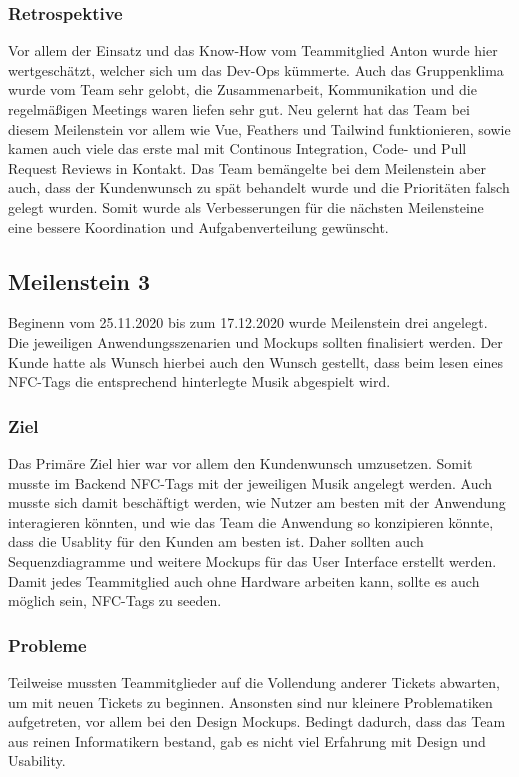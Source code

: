 \documentclass[10pt, a4paper, draft]{article}
\begin{document}
\subsubsection{Retrospektive}
Vor allem der Einsatz und das Know-How vom Teammitglied Anton wurde hier wertgeschätzt, welcher sich um das Dev-Ops kümmerte.
Auch das Gruppenklima wurde vom Team sehr gelobt, die Zusammenarbeit, Kommunikation und die regelmäßigen Meetings waren liefen sehr gut.
Neu gelernt hat das Team bei diesem Meilenstein vor allem wie Vue, Feathers und Tailwind funktionieren, sowie kamen auch viele das erste mal mit Continous Integration, Code- und Pull Request Reviews in Kontakt.
Das Team bemängelte bei dem Meilenstein aber auch, dass der Kundenwunsch zu spät behandelt wurde und die Prioritäten falsch gelegt wurden.
Somit wurde als Verbesserungen für die nächsten Meilensteine eine bessere Koordination und Aufgabenverteilung gewünscht.

\subsection{Meilenstein 3}
Beginenn vom 25.11.2020 bis zum 17.12.2020 wurde Meilenstein drei angelegt.
Die jeweiligen Anwendungsszenarien und Mockups sollten finalisiert werden.
Der Kunde hatte als Wunsch hierbei auch den Wunsch gestellt, dass beim lesen eines NFC-Tags die entsprechend hinterlegte Musik abgespielt wird.
\subsubsection{Ziel}
Das Primäre Ziel hier war vor allem den Kundenwunsch umzusetzen. Somit musste im Backend NFC-Tags mit der jeweiligen Musik angelegt werden.
Auch musste sich damit beschäftigt werden, wie Nutzer am besten mit der Anwendung interagieren könnten, und wie das Team die Anwendung so konzipieren könnte, dass die Usablity für den Kunden am besten ist.
Daher sollten auch Sequenzdiagramme und weitere Mockups für das User Interface erstellt werden.
Damit jedes Teammitglied auch ohne Hardware arbeiten kann, sollte es auch möglich sein, NFC-Tags zu seeden.
\subsubsection{Probleme}
Teilweise mussten Teammitglieder auf die Vollendung anderer Tickets abwarten, um mit neuen Tickets zu beginnen.
Ansonsten sind nur kleinere Problematiken aufgetreten, vor allem bei den Design Mockups.
Bedingt dadurch, dass das Team aus reinen Informatikern bestand, gab es nicht viel Erfahrung mit Design und Usability.
\end{document}
